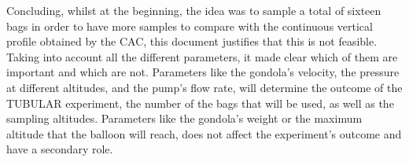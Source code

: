 Concluding, whilst at the beginning, the idea was to sample a total of sixteen bags in order to have more samples to compare with the continuous vertical profile obtained by the CAC, this document justifies that this is not feasible. Taking into account all the different parameters, it made clear which of them are important and which are not. Parameters like the gondola's velocity, the pressure at different altitudes, and the pump's flow rate, will determine the outcome of the TUBULAR experiment, the number of the bags that will be used, as well as the sampling altitudes. Parameters like the gondola's weight or the maximum altitude that the balloon will reach, does not affect the experiment's outcome and have a secondary role.









\newpage
